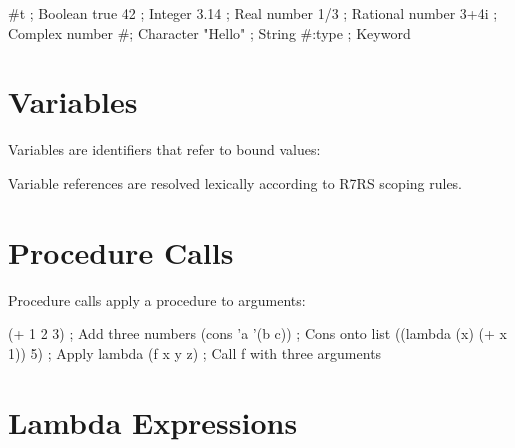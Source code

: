 \begin{example}[Constants]
\begin{lambdustcode}
#t              ; Boolean true
42              ; Integer  
3.14            ; Real number
1/3             ; Rational number
3+4i            ; Complex number
#\lambda        ; Character
"Hello"         ; String
#:type          ; Keyword
\end{lambdustcode}
\end{example}

\section{Variables}
\label{sec:variables}


Variables are identifiers that refer to bound values:

\begin{grammar}
\end{grammar}

Variable references are resolved lexically according to R7RS scoping rules.

\section{Procedure Calls}
\label{sec:procedure-calls}


Procedure calls apply a procedure to arguments:

\begin{grammar}
\end{grammar}

\begin{example}
\begin{lambdustcode}
(+ 1 2 3)                   ; Add three numbers
(cons 'a '(b c))           ; Cons onto list
((lambda (x) (+ x 1)) 5)   ; Apply lambda
(f x y z)                  ; Call f with three arguments
\end{lambdustcode}
\end{example}

\section{Lambda Expressions}
\label{sec:lambda}

